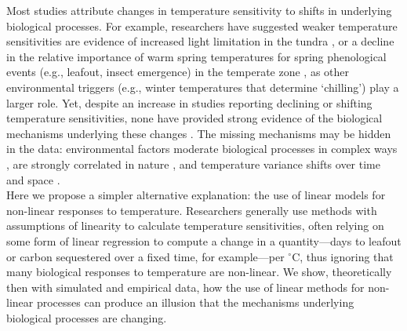 \documentclass[11pt,letter]{article}
\begin{document}
Most studies attribute changes in temperature sensitivity to shifts in underlying biological processes. For example, researchers have suggested weaker temperature sensitivities are evidence of increased light limitation in the tundra \citep{piao2017}, or a decline in the relative importance of warm spring temperatures for spring phenological events (e.g., leafout, insect emergence) in the temperate zone \citep{fu2015,meng2020}, as other environmental triggers (e.g., winter temperatures that determine `chilling') play a larger role. Yet, despite an increase in studies reporting declining or shifting temperature sensitivities, none have provided strong evidence of the biological mechanisms underlying these changes  \citep[e.g.,][]{fu2015,meng2020}. The missing mechanisms may be hidden in the data: environmental factors moderate biological processes in complex ways \citep{chuine2016,gusewell2017}, are strongly correlated in nature \citep[e.g.,][]{fu2015}, and temperature variance shifts over time and space \citep{keenan2019}. \\

Here we propose a simpler alternative explanation: the use of linear models for non-linear responses to temperature. Researchers generally use methods with assumptions of linearity to calculate temperature sensitivities, often relying on some form of linear regression to compute a change in a quantity---days to leafout or carbon sequestered over a fixed time, for example---per $^{\circ}$C, thus ignoring that many biological responses to temperature are non-linear. We show, theoretically then with simulated and empirical data, how the use of linear methods for non-linear processes can produce an illusion that the mechanisms underlying biological processes are changing.\\ %
\end{document}
